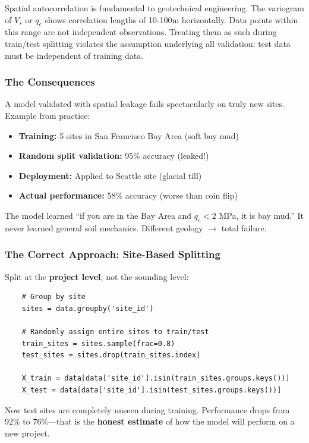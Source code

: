 \documentclass[12pt]{article}
\begin{document}
Spatial autocorrelation is fundamental to geotechnical engineering. The variogram of $V_s$ or $q_c$ shows correlation lengths of 10-100m horizontally. Data points within this range are not independent observations. Treating them as such during train/test splitting violates the assumption underlying all validation: test data must be independent of training data.

\subsubsection{The Consequences}

A model validated with spatial leakage fails spectacularly on truly new sites. Example from practice:

\begin{itemize}
	\item \textbf{Training:} 5 sites in San Francisco Bay Area (soft bay mud)
	\item \textbf{Random split validation:} 95\% accuracy (leaked!)
	\item \textbf{Deployment:} Applied to Seattle site (glacial till)
	\item \textbf{Actual performance:} 58\% accuracy (worse than coin flip)
\end{itemize}

The model learned ``if you are in the Bay Area and $q_c < 2$ MPa, it is bay mud.'' It never learned general soil mechanics. Different geology $\to$ total failure.

\subsubsection{The Correct Approach: Site-Based Splitting}

Split at the \textbf{project level}, not the sounding level:

\begin{lstlisting}
	# Group by site
	sites = data.groupby('site_id')
	
	# Randomly assign entire sites to train/test
	train_sites = sites.sample(frac=0.8)
	test_sites = sites.drop(train_sites.index)
	
	X_train = data[data['site_id'].isin(train_sites.groups.keys())]
	X_test = data[data['site_id'].isin(test_sites.groups.keys())]
\end{lstlisting}

Now test sites are completely unseen during training. Performance drops from 92\% to 76\%---that is the \textbf{honest estimate} of how the model will perform on a new project.
\end{document}
